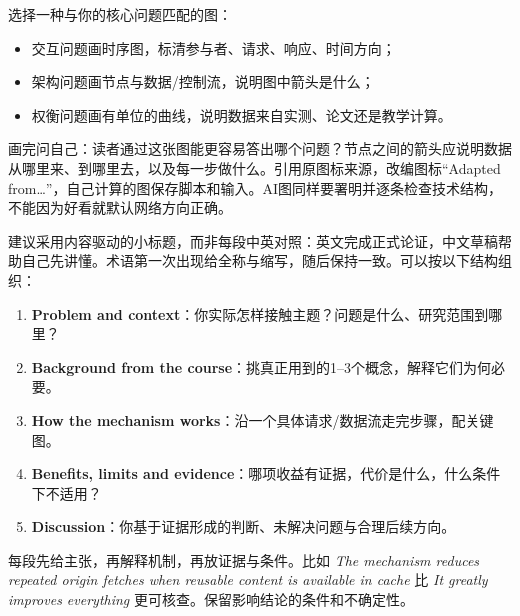 

选择一种与你的核心问题匹配的图：



\begin{itemize}

\item 交互问题画时序图，标清参与者、请求、响应、时间方向；

\item 架构问题画节点与数据/控制流，说明图中箭头是什么；

\item 权衡问题画有单位的曲线，说明数据来自实测、论文还是教学计算。

\end{itemize}


画完问自己：读者通过这张图能更容易答出哪个问题？节点之间的箭头应说明数据从哪里来、到哪里去，以及每一步做什么。引用原图标来源，改编图标“Adapted from…”，自己计算的图保存脚本和输入。AI图同样要署明并逐条检查技术结构，不能因为好看就默认网络方向正确。





建议采用内容驱动的小标题，而非每段中英对照：英文完成正式论证，中文草稿帮助自己先讲懂。术语第一次出现给全称与缩写，随后保持一致。可以按以下结构组织：



\begin{enumerate}[start=1]

\item \textbf{Problem and context}：你实际怎样接触主题？问题是什么、研究范围到哪里？

\item \textbf{Background from the course}：挑真正用到的1–3个概念，解释它们为何必要。

\item \textbf{How the mechanism works}：沿一个具体请求/数据流走完步骤，配关键图。

\item \textbf{Benefits, limits and evidence}：哪项收益有证据，代价是什么，什么条件下不适用？

\item \textbf{Discussion}：你基于证据形成的判断、未解决问题与合理后续方向。

\end{enumerate}


每段先给主张，再解释机制，再放证据与条件。比如 \emph{The mechanism reduces repeated origin fetches when reusable content is available in cache} 比 \emph{It greatly improves everything} 更可核查。保留影响结论的条件和不确定性。


